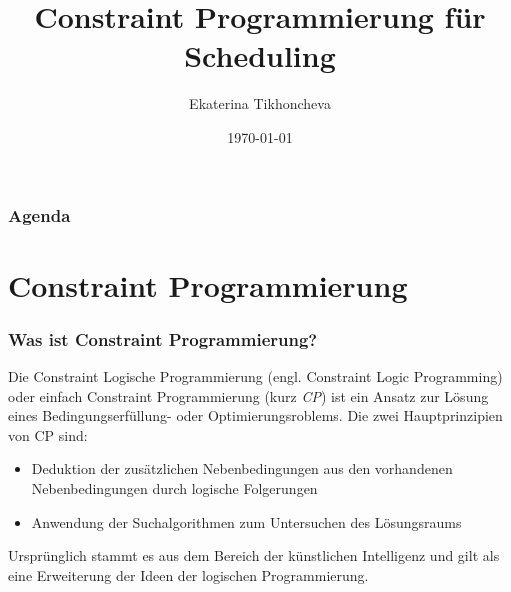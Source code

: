 \documentclass[hyperref={pdfpagelabels=false}]{beamer}
\title{Constraint Programmierung für Scheduling}
\author{Ekaterina Tikhoncheva}
\date{\today}
\newcommand{\inhalt}{\frame{   \frametitle{Überblick}   \tableofcontents[currentsection]}}
\begin{document}
\begin{frame}
\titlepage
\end{frame}
\begin{frame}
\frametitle{Agenda}
\tableofcontents
\end{frame} 


\section{Constraint Programmierung}
\inhalt

\nocite{CSP}
\nocite{CPforScheduling}
\begin{frame}

\frametitle{Was ist Constraint Programmierung?}

\begin{block}{}
    Die {\color{darkred} Constraint Logische Programmierung} (engl. Constraint Logic Programming) oder einfach {\color{darkred}Constraint Programmierung} (kurz {\color{darkred} \it CP}) ist ein Ansatz zur Lösung eines Bedingungserfüllung- oder Optimierungsroblems. Die zwei Hauptprinzipien von CP sind:\\
    \begin{itemize}
    \item Deduktion der zusätzlichen Nebenbedingungen aus den vorhandenen Nebenbedingungen durch logische Folgerungen
    \item Anwendung der Suchalgorithmen zum Untersuchen des Lösungsraums
    \end{itemize}
\end{block}

\pause 
{\centering
Ursprünglich stammt es aus dem Bereich der künstlichen Intelligenz und gilt als eine Erweiterung
der Ideen der logischen Programmierung.
}

\end{frame}

\end{document}

